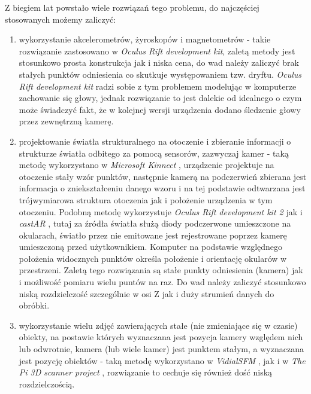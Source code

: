 Z biegiem lat powstało wiele rozwiązań tego problemu, do najczęściej stosowanych możemy zaliczyć:
\begin{enumerate}
 \item 
 wykorzystanie akcelerometrów, żyroskopów i magnetometrów - 
takie rozwiązanie zastosowano w \textit{Oculus Rift development kit}, zaletą metody jest stosunkowo
prosta konstrukcja jak i niska cena,
do wad należy zaliczyć brak stałych punktów odniesienia co skutkuje występowaniem tzw. dryftu.
\textit{Oculus Rift development kit} radzi sobie z tym problemem modelując w komputerze zachowanie się głowy,
jednak rozwiązanie to jest dalekie od idealnego o czym może świadczyć fakt, że w kolejnej wersji 
urządzenia dodano śledzenie głowy przez zewnętrzną kamerę.

\item \label{itm:second_method}
 projektowanie światła strukturalnego na otoczenie i zbieranie informacji o strukturze 
 światła odbitego za pomocą sensorów, zazwyczaj kamer - taką metodę wykorzystano w \textit{Microsoft Kinnect} \cite{bib:MicrosoftKinect},
 urządzenie projektuje na otoczenie stały wzór punktów, następnie kamerą na podczerwień
 zbierana jest informacja o zniekształceniu danego wzoru i na tej podstawie odtwarzana jest 
 trójwymiarowa struktura otoczenia jak i położenie urządzenia w tym otoczeniu.
 Podobną metodę wykorzystuje \textit{Oculus Rift development kit 2} \cite{bib:OculusRiftDK2} jak i 
 \textit{castAR} \cite{bib:castAR}, tutaj za źródła światła służą diody podczerwone umieszczone na okularach,
 światło przez nie emitowane jest rejestrowane poprzez kamerę umieszczoną przed użytkownikiem.
 Komputer na podstawie względnego położenia widocznych punktów określa położenie i orientację
 okularów w przestrzeni.
 Zaletą tego rozwiązania są stałe punkty odniesienia (kamera) jak i możliwość pomiaru wielu puntów na raz.
 Do wad należy zaliczyć stosunkowo niską rozdzielczość szczególnie w osi Z jak i duży strumień danych do obróbki.

\item
 wykorzystanie wielu zdjęć zawierających stałe (nie zmieniające się w czasie) obiekty, na postawie których wyznaczana jest pozycja kamery względem nich
  lub odwrotnie, kamera (lub wiele kamer) jest punktem stałym, a wyznaczana jest pozycję obiektów -   
 taką metodę wykorzystano w \textit{VidialSFM} \cite{bib:VisualSFM}, jak i w \textit{The Pi 3D scanner project} \cite{bib:pi3dscan}, 
 rozwiązanie to cechuje się również dość niską rozdzielczością.
 
\end{enumerate}
 

